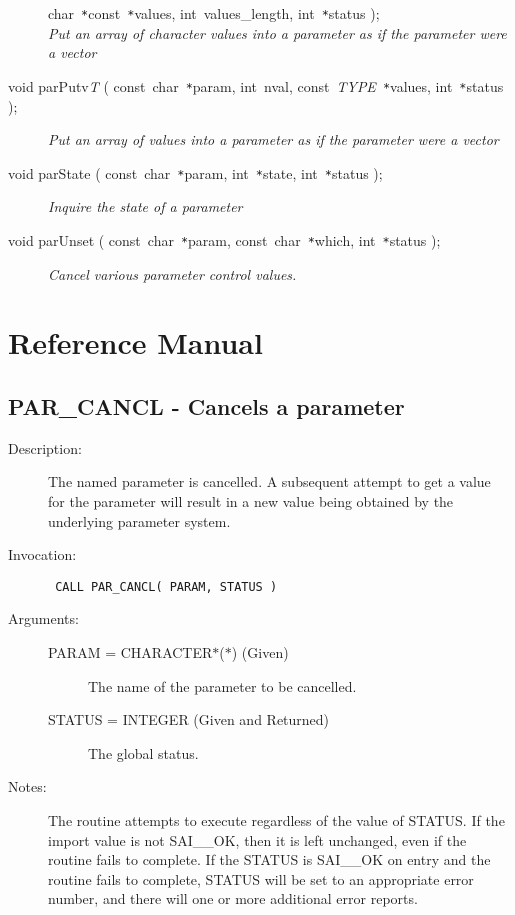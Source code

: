 \documentclass[twoside,11pt]{article}
\newcommand{\xlabel}[1]{}
\newcommand{\listline}{\hspace{1pt}\\}
\renewcommand{\listline}{}
\newlength{\sstbannerlength}
\newlength{\sstcaptionlength}
\newlength{\sstexampleslength}
\newlength{\sstexampleswidth}
\newcommand{\sstroutine}[3]{
   \goodbreak
   \rule{\textwidth}{0.5mm}
   \vspace{-7ex}
   \newline
   \settowidth{\sstbannerlength}{{\Large {\bf #1}}}
   \setlength{\sstcaptionlength}{\textwidth}
   \setlength{\sstexampleslength}{\textwidth}
   \addtolength{\sstbannerlength}{0.5em}
   \addtolength{\sstcaptionlength}{-2.0\sstbannerlength}
   \addtolength{\sstcaptionlength}{-5.0pt}
   \settowidth{\sstexampleswidth}{{\bf Examples:}}
   \addtolength{\sstexampleslength}{-\sstexampleswidth}
   \parbox[t]{\sstbannerlength}{\flushleft{\Large {\bf #1}}}
   \parbox[t]{\sstcaptionlength}{\center{\Large #2}}
   \parbox[t]{\sstbannerlength}{\flushright{\Large {\bf #1}}}
   \begin{description}
      #3
   \end{description}
}
\newcommand{\sstdescription}[1]{\item[Description:] #1}
\newcommand{\sstinvocation}[1]{\item[Invocation:]\hspace{0.4em}{\tt #1}}
\newcommand{\sstarguments}[1]{
   \item[Arguments:] \mbox{} \\
   \vspace{-3.5ex}
   \begin{description}
      #1
   \end{description}
}
\newcommand{\sstsubsection}[1]{ \item[{#1}] \mbox{} \\}
\newcommand{\sstnotes}[1]{\item[Notes:] \mbox{} \\[1.3ex] #1}
\newcommand{\ssttt}{\tt}
\renewcommand{\sstroutine}[3]{
      \subsection{\xlabel{12}#1\xlabel{#1}-\label{#1}#2}
      \begin{description}
         #3
      \end{description}
   }
\renewcommand{\sstdescription}[1]{\item[Description:]
      \begin{description}
         #1
      \end{description}
   }
\renewcommand{\sstinvocation}[1]{\item[Invocation:]
      \begin{description}
         {\ssttt #1}
      \end{description}
   }
\renewcommand{\sstarguments}[1]{
      \item[Arguments:]
      \begin{description}
         #1
      \end{description}
   }
\renewcommand{\sstsubsection}[1]{\item[{#1}]}
\renewcommand{\sstnotes}[1]{\item[Notes:]
      \begin{description}
         #1
      \end{description}
   }
\begin{document}
\begin{flushleft}
\begin{description}
{               char~\texttt{*}const~\texttt{*}values, int~values\_length,
               int~\texttt{*}status );} \\
\textit{Put an array of character values into a parameter as if the parameter
            were a vector}
\item[void parPutv\textit{T} ( const~char~\texttt{*}param, int~nval, 
  const~\textit{TYPE}~\texttt{*}values, int~\texttt{*}status );] \listline
\textit{Put an array of values into a parameter as if the parameter were a 
            vector}
\item[void parState ( const~char~\texttt{*}param, int~\texttt{*}state,
  int~\texttt{*}status );] \listline
\textit{Inquire the state of a parameter}
\item[void parUnset ( const~char~\texttt{*}param, const~char~\texttt{*}which,
  int~\texttt{*}status );] \listline
\textit{Cancel various parameter control values.}
\end{description}
\end{flushleft}

\newpage
\section{\xlabel{reference_manual}Reference Manual}
\label{ap:ref}

\sstroutine{
   PAR\_CANCL
}{
   Cancels a parameter
}{
   \sstdescription{
      The named parameter is cancelled. A subsequent attempt to get a value
      for the parameter will result in a new value being obtained by the
      underlying parameter system.
   }
   \sstinvocation{
      CALL PAR\_CANCL( PARAM, STATUS )
   }
   \sstarguments{
      \sstsubsection{
         PARAM = CHARACTER$*$($*$) (Given)
      }{
         The name of the parameter to be cancelled.
      }
      \sstsubsection{
         STATUS = INTEGER (Given and Returned)
      }{
         The global status.
      }
   }
   \sstnotes{
      The routine attempts to execute regardless of the value of
      STATUS.  If the import value is not SAI\_\_OK, then it is left
      unchanged, even if the routine fails to complete.  If the STATUS
      is SAI\_\_OK on entry and the routine fails to complete, STATUS
      will be set to an appropriate error number, and there will one or
      more additional error reports.
   }
}
\end{document}
